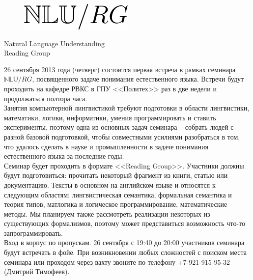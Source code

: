 \documentclass[12pt]{article}
\begin{document}
\baselineskip 24pt

\parindent 0cm

\begin{figure}
  \begin{center}
    \includegraphics[scale=0.70]{nlu-rg-logo.png}
  \end{center}
\end{figure}

\begin{center}
{\rm \Huge{Natural Language Understanding}}\\
\bigskip
{\rm \Large Reading Group}
\end{center}

\bigskip
\bigskip

\baselineskip 15pt

26 сентября 2013 года (четверг) состоится первая встреча в рамках семинара $\mathbb{NLU}/RG$, посвященного задаче понимания естественного языка. Встречи будут проходить на кафедре РВКС в ГПУ <<Политех>> раз в две недели и продолжаться полтора часа.\\

Занятия компьютерной лингвистикой требуют подготовки в области лингвистики, математики, логики, информатики, умения программировать и ставить эксперименты, поэтому одна из основных задач семинара -- собрать людей с разной базовой подготовкой, чтобы совместными усилиями разобраться в том, что удалось сделать в науке и промышленности в задаче понимания естественного языка за последние годы.\\

Семинар будет проходить в формате <<Reading Group>>. Участники должны будут подготовиться: прочитать некоторый фрагмент из книги, статью или документацию. Тексты в основном на английском языке и относятся к следующим областям: лингвистическая семантика, формальная семантика и теория типов, матлогика и логическое программирование, математические методы. Мы планируем также рассмотреть реализации некоторых из существующих формализмов, поэтому может представиться возможность что-то запрограммировать.\\

Вход в корпус по пропускам. 26 сентября с 19:40 до 20:00 участников семинара будут встречать в фойе. При возникновении любых сложностей с поиском места семинара или проходом через вахту звоните по телефону +7-921-915-95-32 (Дмитрий Тимофеев).\\
\end{document}
